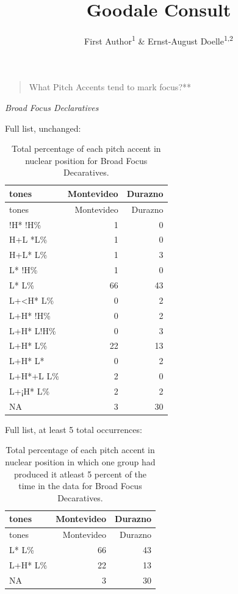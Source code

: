 \documentclass[
  man]{apa6}
\title{Goodale Consult}
\author{First Author\textsuperscript{1} \& Ernst-August Doelle\textsuperscript{1,2}}
\date{}
\affiliation{\vspace{0.5cm}\textsuperscript{1} Wilhelm-Wundt-University\\\textsuperscript{2} Konstanz Business School}
\begin{document}
\maketitle

\begin{quote}
What Pitch Accents tend to mark focus?**
\end{quote}

\emph{Broad Focus Declaratives}

Full list, unchanged:

\begin{longtable}[]{@{}lrr@{}}
\caption{\label{tab:unnamed-chunk-3}Total percentage of each pitch accent in nuclear position for Broad Focus Decaratives.}\tabularnewline
\toprule\noalign{}
tones & Montevideo & Durazno \\
\midrule\noalign{}
\endfirsthead
\toprule\noalign{}
tones & Montevideo & Durazno \\
\midrule\noalign{}
\endhead
\bottomrule\noalign{}
\endlastfoot
!H* !H\% & 1 & 0 \\
H+L *L\% & 1 & 0 \\
H+L* L\% & 1 & 3 \\
L* !H\% & 1 & 0 \\
L* L\% & 66 & 43 \\
L+\textless H* L\% & 0 & 2 \\
L+H* !H\% & 0 & 2 \\
L+H* L!H\% & 0 & 3 \\
L+H* L\% & 22 & 13 \\
L+H* L* & 0 & 2 \\
L+H*+L L\% & 2 & 0 \\
L+¡H* L\% & 2 & 2 \\
NA & 3 & 30 \\
\end{longtable}

Full list, at least 5 total occurrences:

\begin{longtable}[]{@{}lrr@{}}
\caption{\label{tab:unnamed-chunk-4}Total percentage of each pitch accent in nuclear position in which one group had produced it atleast 5 percent of the time in the data for Broad Focus Decaratives.}\tabularnewline
\toprule\noalign{}
tones & Montevideo & Durazno \\
\midrule\noalign{}
\endfirsthead
\toprule\noalign{}
tones & Montevideo & Durazno \\
\midrule\noalign{}
\endhead
\bottomrule\noalign{}
\endlastfoot
L* L\% & 66 & 43 \\
L+H* L\% & 22 & 13 \\
NA & 3 & 30 \\
\end{longtable}
\end{document}
